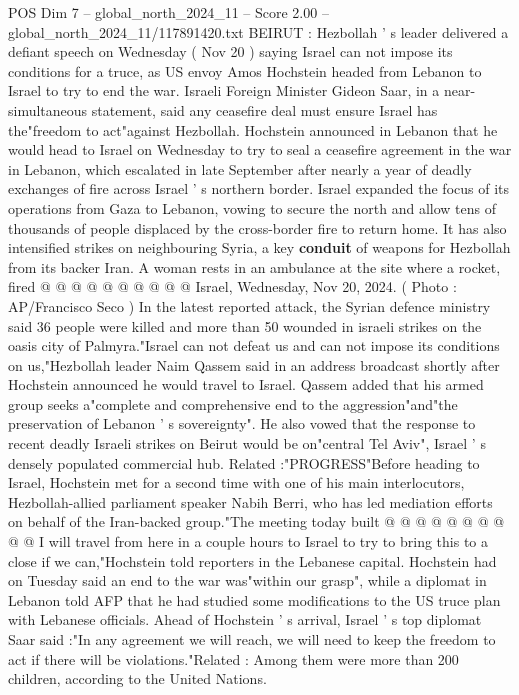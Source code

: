 \begin{textsample}{POS Dim 7 – global\_north\_2024\_11 – Score 2.00 – global\_north\_2024\_11/117891420.txt}  \label{ex:f7_pos_196}
BEIRUT : Hezbollah ' s leader delivered a defiant speech on Wednesday ( Nov 20 ) saying Israel can not impose its conditions for a truce, as US envoy Amos Hochstein headed from Lebanon to Israel to try to end the war.
Israeli Foreign Minister Gideon Saar, in a near-simultaneous statement, said any ceasefire deal must ensure Israel has the"freedom to act"against Hezbollah.
Hochstein announced in Lebanon that he would head to Israel on Wednesday to try to seal a ceasefire agreement in the war in Lebanon, which escalated in late September after nearly a year of deadly exchanges of fire across Israel ' s northern border.
Israel expanded the focus of its operations from Gaza to Lebanon, vowing to secure the north and allow tens of thousands of people displaced by the cross-border fire to return home.
It has also intensified strikes on neighbouring Syria, a key \textbf{conduit} of weapons for Hezbollah from its backer Iran.
A woman rests in an ambulance at the site where a rocket, fired @ @ @ @ @ @ @ @ @ @ Israel, Wednesday, Nov 20, 2024. ( Photo : AP/Francisco Seco ) In the latest reported attack, the Syrian defence ministry said 36 people were killed and more than 50 wounded in israeli strikes on the oasis city of Palmyra."Israel can not defeat us and can not impose its conditions on us,"Hezbollah leader Naim Qassem said in an address broadcast shortly after Hochstein announced he would travel to Israel.
Qassem added that his armed group seeks a"complete and comprehensive end to the aggression"and"the preservation of Lebanon ' s sovereignty".
He also vowed that the response to recent deadly Israeli strikes on Beirut would be on"central Tel Aviv", Israel ' s densely populated commercial hub.
Related :"PROGRESS"Before heading to Israel, Hochstein met for a second time with one of his main interlocutors, Hezbollah-allied parliament speaker Nabih Berri, who has led mediation efforts on behalf of the Iran-backed group."The meeting today built @ @ @ @ @ @ @ @ @ @ I will travel from here in a couple hours to Israel to try to bring this to a close if we can,"Hochstein told reporters in the Lebanese capital.
Hochstein had on Tuesday said an end to the war was"within our grasp", while a diplomat in Lebanon told AFP that he had studied some modifications to the US truce plan with Lebanese officials.
Ahead of Hochstein ' s arrival, Israel ' s top diplomat Saar said :"In any agreement we will reach, we will need to keep the freedom to act if there will be violations."Related : Among them were more than 200 children, according to the United Nations.

\end{textsample}
